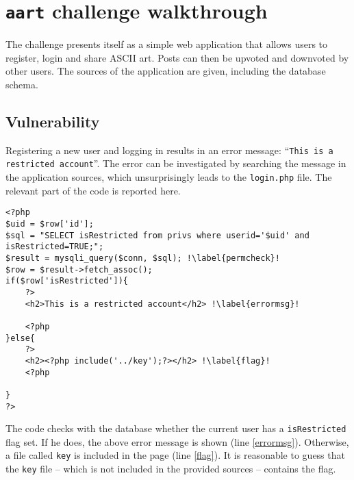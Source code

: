 \section{\texttt{aart} challenge walkthrough}

The challenge presents itself as a simple web application that allows users to register, login and share ASCII art. Posts can then be upvoted and downvoted by other users. The sources of the application are given, including the database schema. \\

\subsection{Vulnerability}
 
Registering a new user and logging in results in an error message: ``\texttt{This is a restricted account}''. The error can be investigated by searching the message in the application sources, which unsurprisingly leads to the \texttt{login.php} file. The relevant part of the code is reported here.

\begin{verbatim}
<?php
$uid = $row['id'];
$sql = "SELECT isRestricted from privs where userid='$uid' and isRestricted=TRUE;";
$result = mysqli_query($conn, $sql); !\label{permcheck}!
$row = $result->fetch_assoc();
if($row['isRestricted']){
    ?>
    <h2>This is a restricted account</h2> !\label{errormsg}!

    <?php
}else{
    ?>
    <h2><?php include('../key');?></h2> !\label{flag}!
    <?php

}
?>
\end{verbatim}

The code checks with the database whether the current user has a \texttt{isRestricted} flag set. If he does, the above error message is shown (line \ref{errormsg}). Otherwise, a file called \texttt{key} is included in the page (line \ref{flag}). It is reasonable to guess that the \texttt{key} file -- which is not included in the provided sources -- contains the flag. \\

